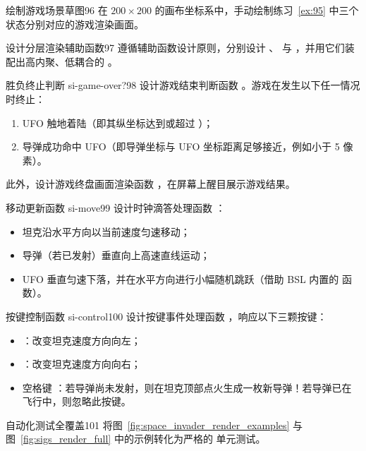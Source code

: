 \begin{exercise}{绘制游戏场景草图}{96}
在 $200 \times 200$ 的画布坐标系中，手动绘制练习~\ref{ex:95} 中三个状态分别对应的游戏渲染画面。
\end{exercise}

\begin{exercise}{设计分层渲染辅助函数}{97}
遵循辅助函数设计原则，分别设计 、 与 ，并用它们装配出高内聚、低耦合的 。
\end{exercise}

\begin{exercise}{胜负终止判断 si-game-over?}{98}
设计游戏结束判断函数 。游戏在发生以下任一情况时终止：
\begin{enumerate}
  \item UFO 触地着陆（即其纵坐标达到或超过 ）；
  \item 导弹成功命中 UFO（即导弹坐标与 UFO 坐标距离足够接近，例如小于 5 像素）。
\end{enumerate}
此外，设计游戏终盘画面渲染函数 ，在屏幕上醒目展示游戏结果。
\end{exercise}

\begin{exercise}{移动更新函数 si-move}{99}
设计时钟滴答处理函数 ：
\begin{itemize}
  \item 坦克沿水平方向以当前速度匀速移动；
  \item 导弹（若已发射）垂直向上高速直线运动；
  \item UFO 垂直匀速下落，并在水平方向进行小幅随机跳跃（借助 BSL 内置的  函数）。
\end{itemize}
\end{exercise}

\begin{exercise}{按键控制函数 si-control}{100}
设计按键事件处理函数 ，响应以下三颗按键：
\begin{itemize}
  \item {}：改变坦克速度方向向左；
  \item {}：改变坦克速度方向向右；
  \item 空格键 ：若导弹尚未发射，则在坦克顶部点火生成一枚新导弹！若导弹已在飞行中，则忽略此按键。
\end{itemize}
\end{exercise}

\begin{exercise}{自动化测试全覆盖}{101}
将图~\ref{fig:space_invader_render_examples} 与图~\ref{fig:sigs_render_full} 中的示例转化为严格的  单元测试。
\end{exercise}

